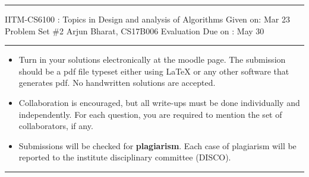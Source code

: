 \documentclass[solution,12pt]{exam}
\begin{document}
\hrule
\vspace{3mm}
\noindent 
{\sf IITM-CS6100 : Topics in Design and analysis of Algorithms  \hfill Given on: Mar 23}
\vspace{3mm}\\
\noindent 
{\sf Problem Set \#2 \hfill Arjun Bharat, CS17B006}
{\hfill \sf Evaluation Due on : May 30 }
\vspace{3mm}
\hrule
{\small
\begin{itemize}
\item Turn in your solutions electronically at the moodle page. The submission should be a pdf file typeset either using     LaTeX or any other software that generates pdf. No handwritten solutions are accepted. 
\item Collaboration is encouraged, but all write-ups must be done
  individually and independently. For each question, you are required to mention the set of collaborators, if any.  
 \item Submissions will be checked for {\bf plagiarism}. Each case of plagiarism will be reported to the institute disciplinary committee (DISCO). 
\end{itemize}}
\hrule
\vspace{3mm}
\end{document}
